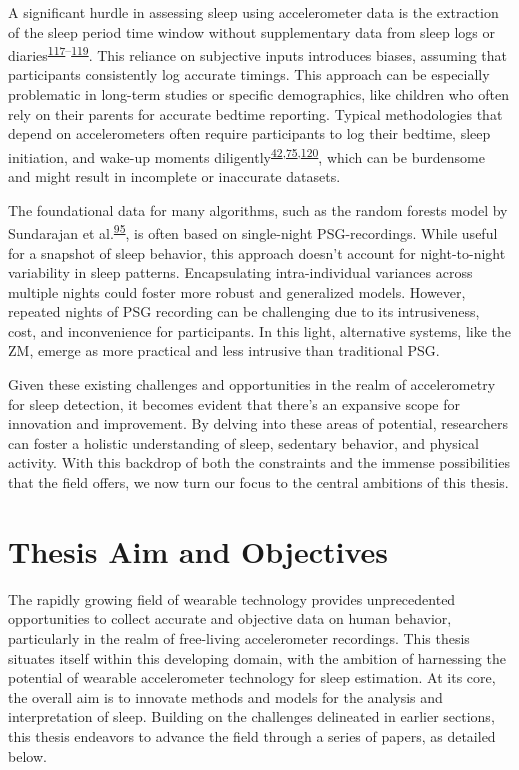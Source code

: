 \documentclass[
  10pt,
]{scrbook}
\begin{document}
A significant hurdle in assessing sleep using accelerometer data is the
extraction of the sleep period time window without supplementary data
from sleep logs or
diaries\textsuperscript{\protect\hyperlink{ref-doherty_large_2017}{117}--\protect\hyperlink{ref-anderson_assessment_2014}{119}}.
This reliance on subjective inputs introduces biases, assuming that
participants consistently log accurate timings. This approach can be
especially problematic in long-term studies or specific demographics,
like children who often rely on their parents for accurate bedtime
reporting. Typical methodologies that depend on accelerometers often
require participants to log their bedtime, sleep initiation, and wake-up
moments
diligently\textsuperscript{\protect\hyperlink{ref-girschik_validation_2012}{42},\protect\hyperlink{ref-littner_2003}{75},\protect\hyperlink{ref-lockley_1999}{120}},
which can be burdensome and might result in incomplete or inaccurate
datasets.

The foundational data for many algorithms, such as the random forests
model by Sundarajan et
al.\textsuperscript{\protect\hyperlink{ref-sundararajan_sleep_2021}{95}},
is often based on single-night PSG-recordings. While useful for a
snapshot of sleep behavior, this approach doesn't account for
night-to-night variability in sleep patterns. Encapsulating
intra-individual variances across multiple nights could foster more
robust and generalized models. However, repeated nights of PSG recording
can be challenging due to its intrusiveness, cost, and inconvenience for
participants. In this light, alternative systems, like the ZM, emerge as
more practical and less intrusive than traditional PSG.

Given these existing challenges and opportunities in the realm of
accelerometry for sleep detection, it becomes evident that there's an
expansive scope for innovation and improvement. By delving into these
areas of potential, researchers can foster a holistic understanding of
sleep, sedentary behavior, and physical activity. With this backdrop of
both the constraints and the immense possibilities that the field
offers, we now turn our focus to the central ambitions of this thesis.

\hypertarget{thesis-aim-and-objectives}{%
\section{Thesis Aim and Objectives}\label{thesis-aim-and-objectives}}

The rapidly growing field of wearable technology provides unprecedented
opportunities to collect accurate and objective data on human behavior,
particularly in the realm of free-living accelerometer recordings. This
thesis situates itself within this developing domain, with the ambition
of harnessing the potential of wearable accelerometer technology for
sleep estimation. At its core, the overall aim is to innovate methods
and models for the analysis and interpretation of sleep. Building on the
challenges delineated in earlier sections, this thesis endeavors to
advance the field through a series of papers, as detailed below.
\end{document}
